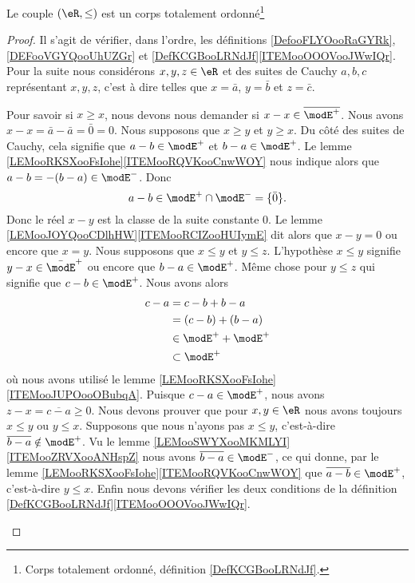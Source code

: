 \begin{proposition} \label{PROPooYMJVooNAsXae}
	Le couple \( (\eR,\leq)\) est un corps totalement ordonné\footnote{Corps totalement ordonné, définition \ref{DefKCGBooLRNdJf}.}
\end{proposition}

\begin{proof}
    Il s'agit de vérifier, dans l'ordre, les définitions \ref{DefooFLYOooRaGYRk}, \ref{DEFooVGYQooUhUZGr} et \ref{DefKCGBooLRNdJf}\ref{ITEMooOOOVooJWwIQr}. Pour la suite nous considérons \( x,y,z\in \eR\) et des suites de Cauchy \( a,b,c\) représentant \( x,y,z\), c'est à dire telles que \( x=\bar a\), \( y=\bar b\) et \( z=\bar c\).
	\begin{subproof}
		\spitem[Réflexivité]
		Pour savoir si \( x\geq x\), nous devons nous demander si \( x-x\in\overline{ \modE^+ }\). Nous avons \( x-x=\bar a-\bar a=\bar 0=0\).
		\spitem[antisymétrie]
		Nous supposons que \( x\geq y\) et \( y\geq x\). Du côté des suites de Cauchy, cela signifie que \( a-b\in\modE^+\) et \( b-a\in \modE^+\). Le lemme \ref{LEMooRKSXooFsIohe}\ref{ITEMooRQVKooCnwWOY} nous indique alors que \( a-b=-(b-a)\in \modE^-\). Donc
		\begin{equation}
			a-b\in\modE^+\cap\modE^-=\{ \bar 0 \}.
		\end{equation}
		Donc le réel \( x-y\) est la classe de la suite constante \( 0\). Le lemme \ref{LEMooJOYQooCDlhHW}\ref{ITEMooRCIZooHUIymE} dit alors que \( x-y=0\) ou encore que \( x=y\).
		\spitem[transitivité]
        Nous supposons que \( x\leq y\) et \( y\leq z\). L'hypothèse \( x\leq y\) signifie \( y-x\in\bar\modE^+\) ou encore que \( b-a\in\modE^+\). Même chose pour \( y\leq z\) qui signifie que \( c-b\in\modE^+\). Nous avons alors
		\begin{subequations}
			\begin{align}
				c-a & =c-b+b-a            \\
				    & =(c-b)+(b-a)        \\
				    & \in \modE^++\modE^+ \\
				    & \subset \modE^+
			\end{align}
		\end{subequations}
		où nous avons utilisé le lemme \ref{LEMooRKSXooFsIohe}\ref{ITEMooJUPOooOBubqA}. Puisque \( c-a\in\modE^+\), nous avons \( z-x=\overline{ c-a }\geq 0\).
		Nous devons prouver que pour \( x,y\in \eR\) nous avons toujours \( x\leq y\) ou \( y\leq x\). Supposons que nous n'ayons pas \( x\leq y\), c'est-à-dire \( \overline{ b-a }\notin \modE^+\). Vu le lemme \ref{LEMooSWYXooMKMLYI}\ref{ITEMooZRVXooANHspZ} nous avons \( \overline{ b-a }\in \modE^-\), ce qui donne, par le lemme \ref{LEMooRKSXooFsIohe}\ref{ITEMooRQVKooCnwWOY} que \( \overline{ a-b }\in \modE^+\), c'est-à-dire \( y\leq x\).
		Enfin nous devons vérifier les deux conditions de la définition \ref{DefKCGBooLRNdJf}\ref{ITEMooOOOVooJWwIQr}.


\end{subproof}
\end{proof}
